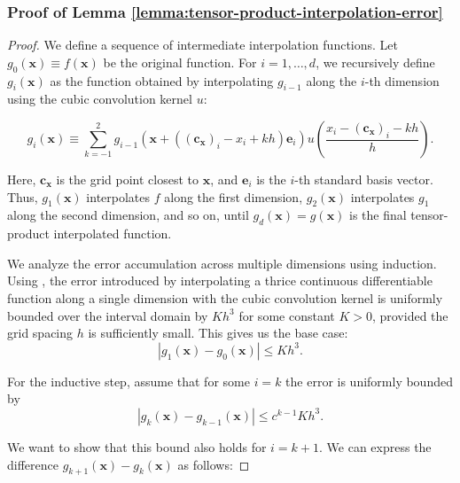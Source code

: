 \subsubsection{Proof of Lemma \ref{lemma:tensor-product-interpolation-error}}\label{sec:proof-tensor-product-interpolation}
\tensorproductinterpolationerror*
\begin{proof}
We define a sequence of intermediate interpolation functions. Let $g_0(\mathbf{x}) \equiv f(\mathbf{x})$ be the original function. For $i = 1, \ldots, d$, we recursively define $g_i(\mathbf{x})$ as the function obtained by interpolating $g_{i-1}$ along the $i$-th dimension using the cubic convolution kernel $u$:

$$
g_i(\mathbf{x}) \equiv \sum_{k=-1}^2 g_{i-1}\left(\mathbf{x} + \left( (\mathbf{c_x})_i - x_i + kh\right)\mathbf{e}_i \right) u\left(\frac{x_i - (\mathbf{c_x})_i - kh}{h}\right).
$$

Here, $\mathbf{c_x}$ is the grid point closest to $\mathbf{x}$, and $\mathbf{e}_i$ is the $i$-th standard basis vector. Thus, $g_1(\mathbf{x})$ interpolates $f$ along the first dimension, $g_2(\mathbf{x})$ interpolates $g_1$ along the second dimension, and so on, until $g_d(\mathbf{x}) = g(\mathbf{x})$ is the final tensor-product interpolated function.

We analyze the error accumulation across multiple dimensions using induction. Using \cite{keys1981cubic}, the error introduced by interpolating a thrice continuous differentiable function along a single dimension with the cubic convolution kernel is uniformly bounded over the interval domain by $Kh^3$ for some constant $K > 0$, provided the grid spacing $h$ is sufficiently small. This gives us the base case:
$$
|g_1(\mathbf{x}) - g_0(\mathbf{x})| \leq Kh^3.
$$

For the inductive step, assume that for some $i=k$ the error is uniformly bounded by
$$
|g_k(\mathbf{x}) - g_{k-1}(\mathbf{x})| \leq c^{k-1}Kh^3.
$$

We want to show that this bound also holds for $i=k+1$. We can express the difference $g_{k+1}(\mathbf{x}) - g_k(\mathbf{x})$ as follows:


\end{proof}
